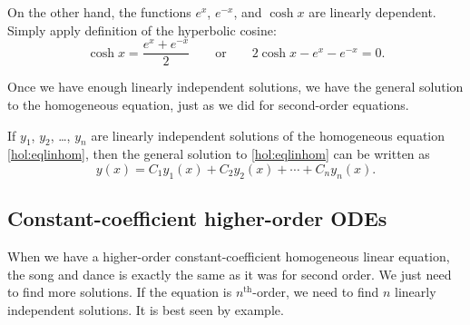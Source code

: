 \begin{example}
On the other hand, the functions $e^x$, $e^{-x}$, and $\cosh x$ are linearly
dependent.  Simply apply definition of the hyperbolic cosine:
\begin{equation*}
\cosh x = \frac{e^x + e^{-x}}{2} 
\qquad
\text{or}
\qquad
2 \cosh x - e^x - e^{-x} = 0.
\end{equation*}
\end{example}

Once we have enough linearly independent solutions, we have the general
solution to the homogeneous equation, just as we did for second-order
equations.

\begin{theorem}
If $y_1$, $y_2$, \ldots, $y_n$ are linearly independent solutions of the
homogeneous equation \eqref{hol:eqlinhom}, then
the general solution to 
\eqref{hol:eqlinhom} can be written as
\begin{equation*}
y(x) = C_1 y_1(x) + C_2 y_2(x) + \cdots + C_n y_n(x) .
\end{equation*}
\end{theorem}

\subsection{Constant-coefficient higher-order ODEs}

When we have a higher-order constant-coefficient homogeneous linear
equation, the song and dance is exactly the same as it was for second order.
We just need to find more solutions.  If the equation is
$n^{\text{th}}$-order, we need to find $n$ linearly independent solutions.
It is best seen by example.

